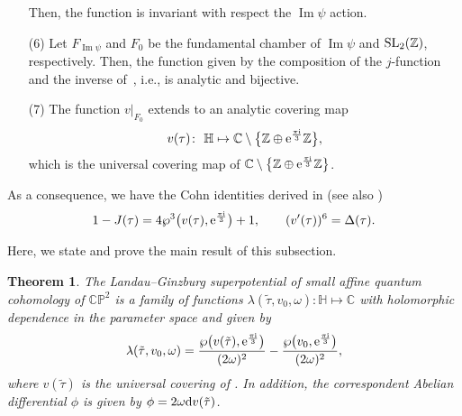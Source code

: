 \documentclass[11pt]{article}
\numberwithin{equation}{section}
\numberwithin{equation}{section}
\newtheorem{Theorem}{Theorem}[section]
\begin{document}
\begin{enumerate}
Then, the function  is invariant with respect the $\operatorname{Im} \psi$ action.
\item[(6)] Let $F_{\operatorname{Im}\psi}$ and $F_0$ be the fundamental chamber of $\operatorname{Im}\psi$ and ${\rm SL}_2(\mathbb{Z})$, respectively. Then, the function
given by the composition of the $j$-function and the inverse of~, i.e.,
is analytic and bijective.
\item[(7)]
The function $v\big|_{F_0}$ extends to an analytic covering map
\begin{gather}\label{universal covering map equiharmonic lattice 2}
v(\tau)\colon \ \mathbb{H}\mapsto \mathbb{C}\setminus\bigl\{ \mathbb{Z}\oplus {\rm e}^{\frac{\pi {\rm i}}{3}}\mathbb{Z}\bigr\} ,
\end{gather}
which is the universal covering map of $ \mathbb{C}\setminus\bigl\{ \mathbb{Z}\oplus {\rm e}^{\frac{\pi {\rm i}}{3}}\mathbb{Z}\bigr\} $.
\end{enumerate}

As a consequence, we have the Cohn identities derived in \cite[Section 9]{Cohn} (see also \cite{M.Batchelor,Golubev})
\begin{gather}
1-J(\tau)=4\wp^3\bigl(v(\tau),{\rm e}^{\frac{\pi {\rm i}}{3}}\bigr)+1,\qquad
(v^{\prime}(\tau))^6=\Delta(\tau).\label{universal covering map equiharmonic lattice}
\end{gather}

Here, we state and prove the main result of this subsection.

\begin{Theorem}
The Landau--Ginzburg superpotential of small affine quantum cohomology of $\mathbb{CP}^2$ is a family of functions
$
\lambda(\tilde\tau, v_0, \omega)\colon \mathbb{H} \mapsto \mathbb{C}
$
with holomorphic dependence in the parameter space
 and given by
\begin{gather*}
\lambda(\tilde\tau,v_0,\omega)=\frac{\wp\bigl(v(\tilde\tau),{\rm e}^{\frac{\pi {\rm i} }{3}}\bigr)}{(2\omega)^2}-\frac{\wp\bigl(v_0,{\rm e}^{\frac{\pi {\rm i} }{3}}\bigr)}{(2\omega)^2},
\end{gather*}
where $v(\tilde\tau)$ is the universal covering of .
 In addition, the correspondent Abelian differential $\phi$ is given by
$
\phi=2\omega {\rm d}v(\tilde\tau)$.

\end{Theorem}
\end{document}
